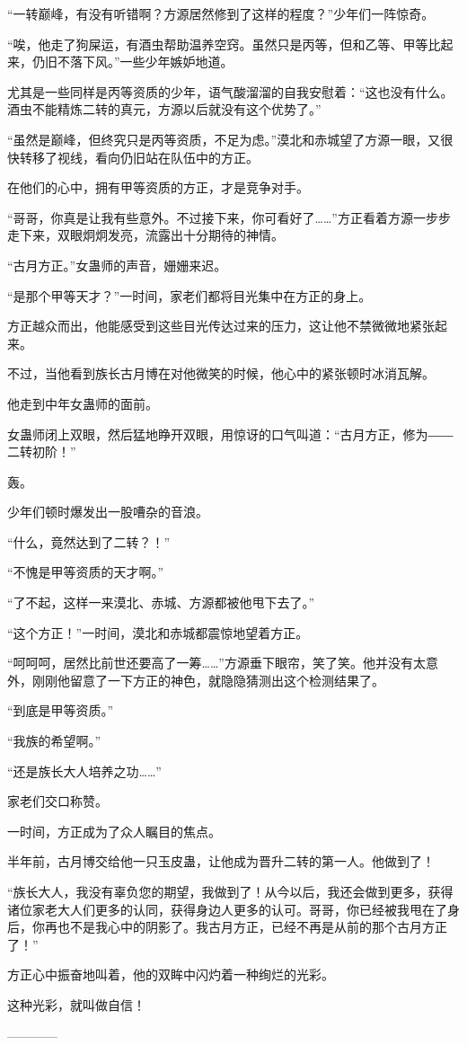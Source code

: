 \begin{this_body}
“一转巅峰，有没有听错啊？方源居然修到了这样的程度？”少年们一阵惊奇。

“唉，他走了狗屎运，有酒虫帮助温养空窍。虽然只是丙等，但和乙等、甲等比起来，仍旧不落下风。”一些少年嫉妒地道。

尤其是一些同样是丙等资质的少年，语气酸溜溜的自我安慰着：“这也没有什么。酒虫不能精炼二转的真元，方源以后就没有这个优势了。”

“虽然是巅峰，但终究只是丙等资质，不足为虑。”漠北和赤城望了方源一眼，又很快转移了视线，看向仍旧站在队伍中的方正。

在他们的心中，拥有甲等资质的方正，才是竞争对手。

“哥哥，你真是让我有些意外。不过接下来，你可看好了……”方正看着方源一步步走下来，双眼炯炯发亮，流露出十分期待的神情。

“古月方正。”女蛊师的声音，姗姗来迟。

“是那个甲等天才？”一时间，家老们都将目光集中在方正的身上。

方正越众而出，他能感受到这些目光传达过来的压力，这让他不禁微微地紧张起来。

不过，当他看到族长古月博在对他微笑的时候，他心中的紧张顿时冰消瓦解。

他走到中年女蛊师的面前。

女蛊师闭上双眼，然后猛地睁开双眼，用惊讶的口气叫道：“古月方正，修为――二转初阶！”

轰。

少年们顿时爆发出一股嘈杂的音浪。

“什么，竟然达到了二转？！”

“不愧是甲等资质的天才啊。”

“了不起，这样一来漠北、赤城、方源都被他甩下去了。”

“这个方正！”一时间，漠北和赤城都震惊地望着方正。

“呵呵呵，居然比前世还要高了一筹……”方源垂下眼帘，笑了笑。他并没有太意外，刚刚他留意了一下方正的神色，就隐隐猜测出这个检测结果了。

“到底是甲等资质。”

“我族的希望啊。”

“还是族长大人培养之功……”

家老们交口称赞。

一时间，方正成为了众人瞩目的焦点。

半年前，古月博交给他一只玉皮蛊，让他成为晋升二转的第一人。他做到了！

“族长大人，我没有辜负您的期望，我做到了！从今以后，我还会做到更多，获得诸位家老大人们更多的认同，获得身边人更多的认可。哥哥，你已经被我甩在了身后，你再也不是我心中的阴影了。我古月方正，已经不再是从前的那个古月方正了！”

方正心中振奋地叫着，他的双眸中闪灼着一种绚烂的光彩。

这种光彩，就叫做自信！

------------

\end{this_body}

